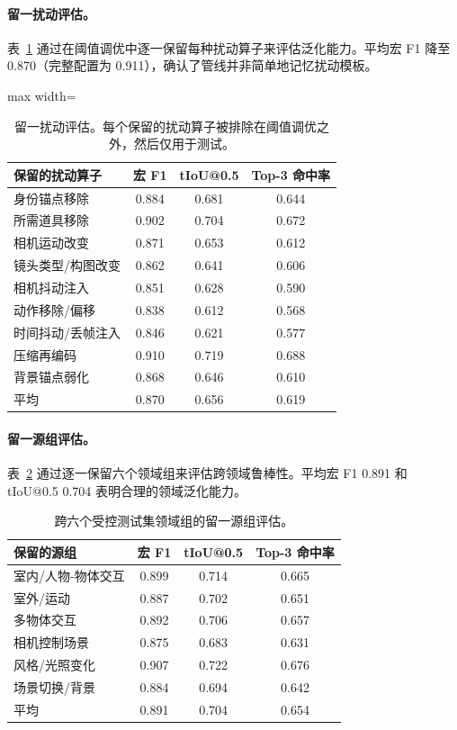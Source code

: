 \documentclass{article}
\begin{document}
\begin{table}[t]
\centering\scriptsize
\caption{留一扰动评估。每个保留的扰动算子被排除在阈值调优之外，然后仅用于测试。}
\paragraph{留一扰动评估。}
表~\ref{tab:leave_one_perturbation} 通过在阈值调优中逐一保留每种扰动算子来评估泛化能力。平均宏 F1 降至 0.870（完整配置为 0.911），确认了管线并非简单地记忆扰动模板。

\label{tab:leave_one_perturbation}
\begin{adjustbox}{max width=\textwidth}
\begin{tabular}{lccc}
\toprule
保留的扰动算子 & 宏 F1 & tIoU@0.5 & Top-3 命中率 \\
\midrule
身份锚点移除 & 0.884 & 0.681 & 0.644 \\
所需道具移除 & 0.902 & 0.704 & 0.672 \\
相机运动改变 & 0.871 & 0.653 & 0.612 \\
镜头类型/构图改变 & 0.862 & 0.641 & 0.606 \\
相机抖动注入 & 0.851 & 0.628 & 0.590 \\
动作移除/偏移 & 0.838 & 0.612 & 0.568 \\
时间抖动/丢帧注入 & 0.846 & 0.621 & 0.577 \\
压缩再编码 & 0.910 & 0.719 & 0.688 \\
背景锚点弱化 & 0.868 & 0.646 & 0.610 \\
\midrule
平均 & 0.870 & 0.656 & 0.619 \\
\bottomrule
\end{tabular}
\end{adjustbox}
\end{table}

\begin{table}[t]
\centering\scriptsize
\caption{跨六个受控测试集领域组的留一源组评估。}
\paragraph{留一源组评估。}
表~\ref{tab:leave_one_source_group} 通过逐一保留六个领域组来评估跨领域鲁棒性。平均宏 F1 0.891 和 tIoU@0.5 0.704 表明合理的领域泛化能力。

\label{tab:leave_one_source_group}
\begin{tabular}{lccc}
\toprule
保留的源组 & 宏 F1 & tIoU@0.5 & Top-3 命中率 \\
\midrule
室内/人物-物体交互 & 0.899 & 0.714 & 0.665 \\
室外/运动 & 0.887 & 0.702 & 0.651 \\
多物体交互 & 0.892 & 0.706 & 0.657 \\
相机控制场景 & 0.875 & 0.683 & 0.631 \\
风格/光照变化 & 0.907 & 0.722 & 0.676 \\
场景切换/背景 & 0.884 & 0.694 & 0.642 \\
\midrule
平均 & 0.891 & 0.704 & 0.654 \\
\bottomrule
\end{tabular}
\end{table}
\end{document}
